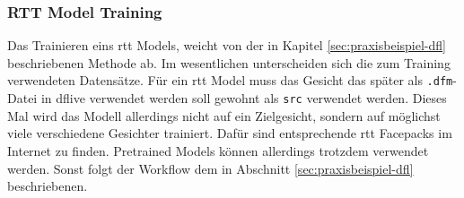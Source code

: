 \subsubsection*{RTT Model Training}
Das Trainieren eins \gls{rtt} Models, weicht von der in Kapitel \ref{sec:praxisbeispiel-dfl} beschriebenen Methode ab.
Im wesentlichen unterscheiden sich die zum Training verwendeten Datensätze.
Für ein \gls{rtt} Model muss das Gesicht das später als \texttt{.dfm}-Datei in \gls{dflive} verwendet werden soll gewohnt als \texttt{src} verwendet werden.
Dieses Mal wird das Modell allerdings nicht auf ein Zielgesicht, sondern auf möglichst viele verschiedene Gesichter trainiert.
Dafür sind entsprechende \gls{rtt} Facepacks im Internet zu finden.
Pretrained Models können allerdings trotzdem verwendet werden.
Sonst folgt der Workflow dem in Abschnitt \ref{sec:praxisbeispiel-dfl} beschriebenen.